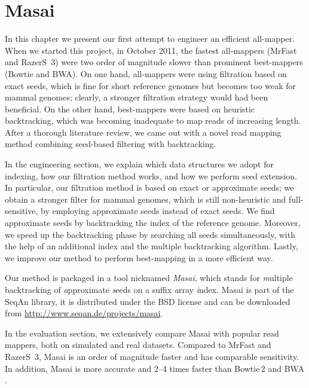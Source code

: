
\chapter{Masai}

In this chapter we present our first attempt to engineer an efficient all-mapper.
When we started this project, in October 2011, the fastest all-mappers (MrFast and RazerS~3) were two order of magnitude slower than prominent best-mappers (Bowtie and BWA).
On one hand, all-mappers were using filtration based on exact seeds, which is fine for short reference genomes but becomes too weak for mammal genomes; clearly, a stronger filtration strategy would had been beneficial.
On the other hand, best-mappers were based on heuristic backtracking, which was becoming inadequate to map reads of increasing length.
After a thorough literature review, we came out with a novel read mapping method combining seed-based filtering with backtracking.

In the engineering section, we explain which data structures we adopt for indexing, how our filtration method works, and how we perform seed extension.
In particular, our filtration method is based on exact or approximate seeds;
we obtain a stronger filter for mammal genomes, which is still non-heuristic and full-sensitive, by employing approximate seeds instead of exact seeds.
We find approximate seeds by backtracking the index of the reference genome.
Moreover, we speed up the backtracking phase by searching all seeds simultaneously, with the help of an additional index and the multiple backtracking algorithm.
Lastly, we improve our method to perform best-mapping in a more efficient way.

Our method is packaged in a \CC tool nicknamed \emph{Masai}, which stands for \emph{m}ultiple backtracking of \emph{a}pproximate \emph{s}eeds on a suffix \emph{a}rray \emph{i}ndex.
Masai is part of the SeqAn library, it is distributed under the BSD license and can be downloaded from \url{http://www.seqan.de/projects/masai}.

In the evaluation section, we extensively compare Masai with popular read mappers, both on simulated and real datasets.
Compared to MrFast and RazerS~3, Masai is an order of magnitude faster and has comparable sensitivity.
In addition, Masai is more accurate and 2--4 times faster than Bowtie\,2 \citep{Bowtie2} and BWA \citep{BWA}.

